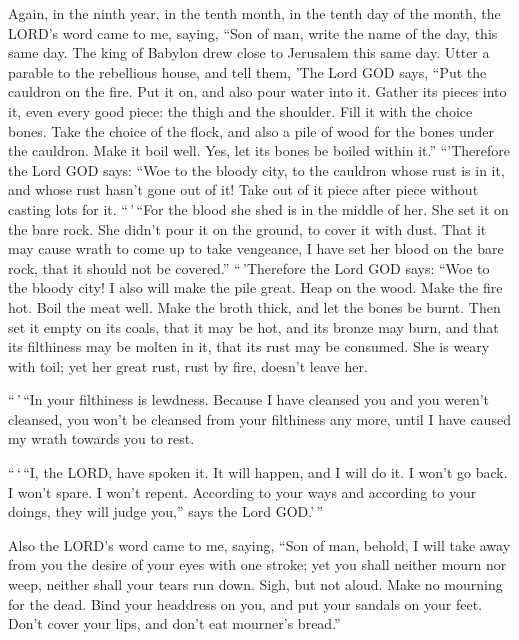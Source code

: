  Again, in the ninth year, in the tenth month, in the
tenth day of the month, the LORD's word came to me, saying,
 ``Son of man, write the name of the day, this same day.
The king of Babylon drew close to Jerusalem this same day.
 Utter a parable to the rebellious house, and tell them,
'The Lord GOD says, ``Put the cauldron on the fire. Put it on, and also
pour water into it.  Gather its pieces into it, even every
good piece: the thigh and the shoulder. Fill it with the choice bones.
 Take the choice of the flock, and also a pile of wood for
the bones under the cauldron. Make it boil well. Yes, let its bones be
boiled within it.''  ``'Therefore the Lord GOD says: ``Woe
to the bloody city, to the cauldron whose rust is in it, and whose rust
hasn't gone out of it! Take out of it piece after piece without casting
lots for it.  ``\,'\,``For the blood she shed is in the
middle of her. She set it on the bare rock. She didn't pour it on the
ground, to cover it with dust.  That it may cause wrath to
come up to take vengeance, I have set her blood on the bare rock, that
it should not be covered.''  ``\,'Therefore the Lord GOD
says: ``Woe to the bloody city! I also will make the pile great.
 Heap on the wood. Make the fire hot. Boil the meat well.
Make the broth thick, and let the bones be burnt.  Then
set it empty on its coals, that it may be hot, and its bronze may burn,
and that its filthiness may be molten in it, that its rust may be
consumed.  She is weary with toil; yet her great rust,
rust by fire, doesn't leave her.

 ``\,'\,``In your filthiness is lewdness. Because I have
cleansed you and you weren't cleansed, you won't be cleansed from your
filthiness any more, until I have caused my wrath towards you to rest.

 ``\,`\,``I, the LORD, have spoken it. It will happen,
and I will do it. I won't go back. I won't spare. I won't repent.
According to your ways and according to your doings, they will judge
you,'' says the Lord GOD.'\,''

 Also the LORD's word came to me, saying, 
``Son of man, behold, I will take away from you the desire of your eyes
with one stroke; yet you shall neither mourn nor weep, neither shall
your tears run down.  Sigh, but not aloud. Make no
mourning for the dead. Bind your headdress on you, and put your sandals
on your feet. Don't cover your lips, and don't eat mourner's bread.''

